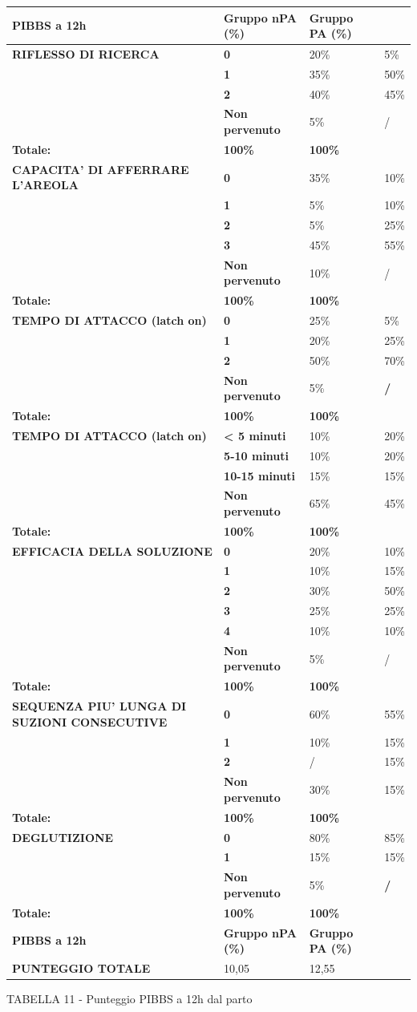 \documentclass[]{article}
\begin{document}
\begin{longtable}[]{@{}llll@{}}
\toprule
\textbf{PIBBS a 12h} & \textbf{Gruppo nPA (\%)} & \textbf{Gruppo PA
(\%)} &\tabularnewline
\midrule
\endhead
\textbf{RIFLESSO DI RICERCA} & \textbf{0} & 20\% & 5\%\tabularnewline
& \textbf{1} & 35\% & 50\%\tabularnewline
& \textbf{2} & 40\% & 45\%\tabularnewline
& \textbf{Non pervenuto} & 5\% & /\tabularnewline
\textbf{Totale:} & \textbf{100\%} & \textbf{100\%} &\tabularnewline
\textbf{CAPACITA' DI AFFERRARE L'AREOLA} & \textbf{0} & 35\% &
10\%\tabularnewline
& \textbf{1} & 5\% & 10\%\tabularnewline
& \textbf{2} & 5\% & 25\%\tabularnewline
& \textbf{3} & 45\% & 55\%\tabularnewline
& \textbf{Non pervenuto} & 10\% & /\tabularnewline
\textbf{Totale:} & \textbf{100\%} & \textbf{100\%} &\tabularnewline
\textbf{TEMPO DI ATTACCO (latch on)} & \textbf{0} & 25\% &
5\%\tabularnewline
& \textbf{1} & 20\% & 25\%\tabularnewline
& \textbf{2} & 50\% & 70\%\tabularnewline
& \textbf{Non pervenuto} & 5\% & \textbf{/}\tabularnewline
\textbf{Totale:} & \textbf{100\%} & \textbf{100\%} &\tabularnewline
\textbf{TEMPO DI ATTACCO (latch on)} & \textbf{\textless{} 5 minuti} &
10\% & 20\%\tabularnewline
& \textbf{5-10 minuti} & 10\% & 20\%\tabularnewline
& \textbf{10-15 minuti} & 15\% & 15\%\tabularnewline
& \textbf{Non pervenuto} & 65\% & 45\%\tabularnewline
\textbf{Totale:} & \textbf{100\%} & \textbf{100\%} &\tabularnewline
\textbf{EFFICACIA DELLA SOLUZIONE} & \textbf{0} & 20\% &
10\%\tabularnewline
& \textbf{1} & 10\% & 15\%\tabularnewline
& \textbf{2} & 30\% & 50\%\tabularnewline
& \textbf{3} & 25\% & 25\%\tabularnewline
& \textbf{4} & 10\% & 10\%\tabularnewline
& \textbf{Non pervenuto} & 5\% & /\tabularnewline
\textbf{Totale:} & \textbf{100\%} & \textbf{100\%} &\tabularnewline
\textbf{SEQUENZA PIU' LUNGA DI SUZIONI CONSECUTIVE} & \textbf{0} & 60\%
& 55\%\tabularnewline
& \textbf{1} & 10\% & 15\%\tabularnewline
& \textbf{2} & / & 15\%\tabularnewline
& \textbf{Non pervenuto} & 30\% & 15\%\tabularnewline
\textbf{Totale:} & \textbf{100\%} & \textbf{100\%} &\tabularnewline
\textbf{DEGLUTIZIONE} & \textbf{0} & 80\% & 85\%\tabularnewline
& \textbf{1} & 15\% & 15\%\tabularnewline
& \textbf{Non pervenuto} & 5\% & \textbf{/}\tabularnewline
\textbf{Totale:} & \textbf{100\%} & \textbf{100\%} &\tabularnewline
\textbf{PIBBS a 12h} & \textbf{Gruppo nPA (\%)} & \textbf{Gruppo PA
(\%)} &\tabularnewline
\textbf{PUNTEGGIO TOTALE} & 10,05 & 12,55 &\tabularnewline
\bottomrule
\end{longtable}

TABELLA 11 - Punteggio PIBBS a 12h dal parto
\end{document}
